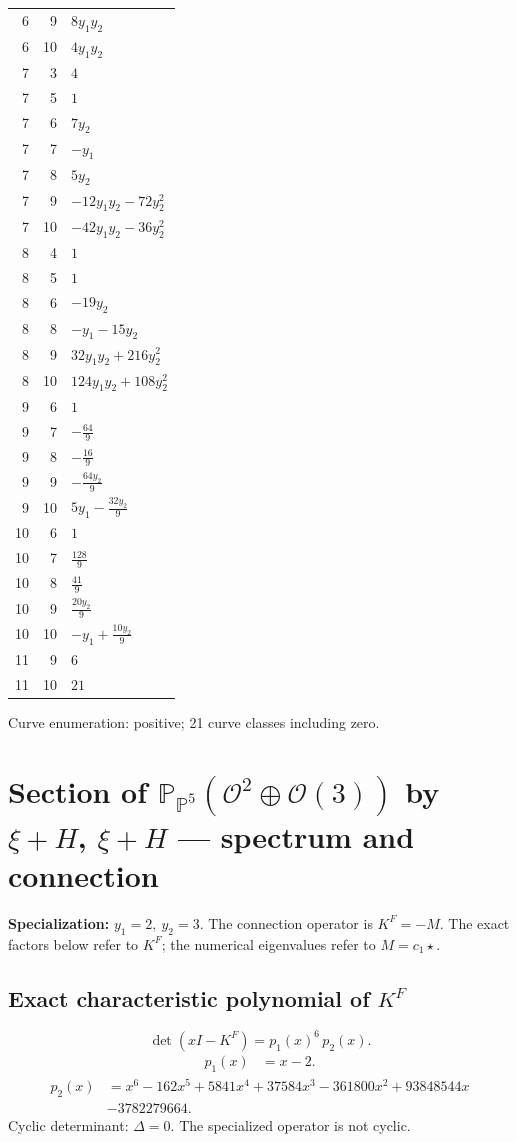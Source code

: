 \documentclass[10pt,a4paper]{article}
\begin{document}
{\begin{longtable}{rrp{125mm}}
6 & 9 & $8 y_{1} y_{2}$\\
6 & 10 & $4 y_{1} y_{2}$\\
7 & 3 & $4$\\
7 & 5 & $1$\\
7 & 6 & $7 y_{2}$\\
7 & 7 & $- y_{1}$\\
7 & 8 & $5 y_{2}$\\
7 & 9 & $- 12 y_{1} y_{2} - 72 y_{2}^{2}$\\
7 & 10 & $- 42 y_{1} y_{2} - 36 y_{2}^{2}$\\
8 & 4 & $1$\\
8 & 5 & $1$\\
8 & 6 & $- 19 y_{2}$\\
8 & 8 & $- y_{1} - 15 y_{2}$\\
8 & 9 & $32 y_{1} y_{2} + 216 y_{2}^{2}$\\
8 & 10 & $124 y_{1} y_{2} + 108 y_{2}^{2}$\\
9 & 6 & $1$\\
9 & 7 & $- \frac{64}{9}$\\
9 & 8 & $- \frac{16}{9}$\\
9 & 9 & $- \frac{64 y_{2}}{9}$\\
9 & 10 & $5 y_{1} - \frac{32 y_{2}}{9}$\\
10 & 6 & $1$\\
10 & 7 & $\frac{128}{9}$\\
10 & 8 & $\frac{41}{9}$\\
10 & 9 & $\frac{20 y_{2}}{9}$\\
10 & 10 & $- y_{1} + \frac{10 y_{2}}{9}$\\
11 & 9 & $6$\\
11 & 10 & $21$\\
\end{longtable}}
Curve enumeration: positive; 21 curve classes including zero.
\clearpage\section*{Section of $\mathbb P_{\mathbb P^{5}}(\mathcal O^{2}\oplus \mathcal O(3))$ by $\xi +H$, $\xi +H$ --- spectrum and connection}
\textbf{Specialization:} $y_1=2,\ y_2=3$. The connection operator is $K^F=-M$. The exact factors below refer to $K^F$; the numerical eigenvalues refer to $M=c_1\star$.
\subsection*{Exact characteristic polynomial of $K^F$}
\[\det(xI-K^F)=p_{1}(x)^{6}\,p_{2}(x).\]
\[\begin{aligned}p_{1}(x)&=x - 2.\end{aligned}\]
\[\begin{aligned}p_{2}(x)&=x^{6} - 162 x^{5} + 5841 x^{4} + 37584 x^{3} - 361800 x^{2} + 93848544 x\\&-3782279664.\end{aligned}\]
Cyclic determinant: $\Delta=0$. The specialized operator is not cyclic.
\end{document}
